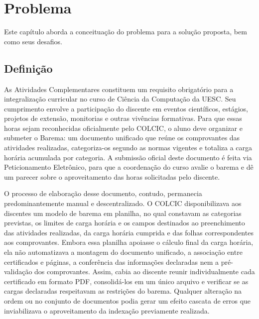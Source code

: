 \chapter{Problema}
\label{cap:problema}
Este capítulo aborda a conceituação do problema para a solução proposta, bem como seus desafios.

\section{Definição}\label{sec:definicao}
As Atividades Complementares constituem um requisito obrigatório para a integralização curricular no curso de Ciência da Computação da UESC. Seu cumprimento envolve a participação do discente em eventos científicos, estágios, projetos de extensão, monitorias e outras vivências formativas. Para que essas horas sejam reconhecidas oficialmente pelo COLCIC, o aluno deve organizar e submeter o Barema: um documento unificado que reúne os comprovantes das atividades realizadas, categoriza-os segundo as normas vigentes e totaliza a carga horária acumulada por categoria. A submissão oficial deste documento é feita via Peticionamento Eletrônico, para que a coordenação do curso avalie o barema e dê um parecer sobre o aproveitamento das horas solicitadas pelo discente. 

O processo de elaboração desse documento, contudo, permanecia predominantemente manual e descentralizado. O COLCIC disponibilizava aos discentes um modelo de barema em planilha, no qual constavam as categorias previstas, os limites de carga horária e os campos destinados ao preenchimento das atividades realizadas, da carga horária cumprida e das folhas correspondentes aos comprovantes. Embora essa planilha apoiasse o cálculo final da carga horária, ela não automatizava a montagem do documento unificado, a associação entre certificados e páginas, a conferência das informações declaradas nem a pré-validação dos comprovantes. Assim, cabia ao discente reunir individualmente cada certificado em formato PDF, consolidá-los em um único arquivo e verificar se as cargas declaradas respeitavam as restrições do barema. Qualquer alteração na ordem ou no conjunto de documentos podia gerar um efeito cascata de erros que inviabilizava o aproveitamento da indexação previamente realizada.

